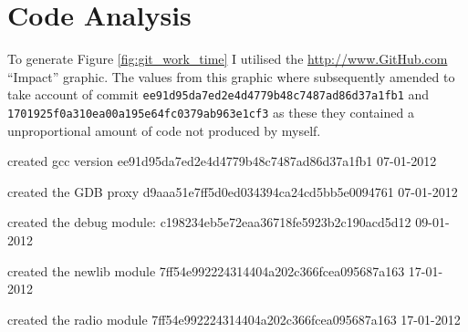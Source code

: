 \chapter{Code Analysis}

To generate Figure \ref{fig:git_work_time} I utilised the \url{http://www.GitHub.com} ``Impact'' graphic.
The values from this graphic where subsequently amended to take account of commit
\texttt{ee91d95da7ed2e4d4779b48c7487ad86d37a1fb1} and
\texttt{1701925f0a310ea00a195e64fc0379ab963e1cf3} as these they contained a unproportional
amount of code not produced by myself.


created gcc version
  ee91d95da7ed2e4d4779b48c7487ad86d37a1fb1
  07-01-2012

created the GDB proxy
  d9aaa51e7ff5d0ed034394ca24cd5bb5e0094761
  07-01-2012

created the debug module:
  c198234eb5e72eaa36718fe5923b2c190acd5d12
  09-01-2012

created the newlib module
  7ff54e992224314404a202c366fcea095687a163
  17-01-2012

created the radio module
  7ff54e992224314404a202c366fcea095687a163
  17-01-2012

